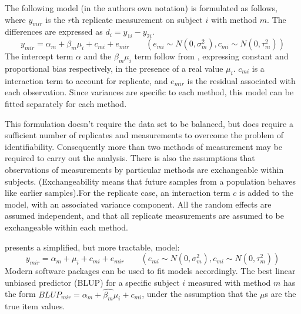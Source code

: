 \documentclass[12pt, a4paper]{report}
\theoremstyle{plain}
\theoremstyle{definition}
\theoremstyle{remark}
\begin{document}
The following model (in the authors own notation) is
formulated as follows, where $y_{mir}$ is the $r$th replicate
measurement on subject $i$ with method $m$. The differences are expressed as $d_{i} = y_{1i} - y_{2i}$.
\begin{equation}
y_{mir}  = \alpha_{m} + \beta_{m}\mu_{i} + c_{mi} + e_{mir} \qquad
( e_{mi} \sim N(0,\sigma^{2}_{m}), c_{mi} \sim N(0,\tau^{2}_{m}))
\end{equation}
The intercept term $\alpha$ and the $\beta_{m}\mu_{i}$ term follow from \citet{DunnSEME}, expressing constant and proportional bias
respectively, in the presence of a real value $\mu_{i}$. $c_{mi}$ is a interaction term to account for replicate, and $e_{mir}$ is the residual associated with each observation. Since variances are specific to each method, this model can be
fitted separately for each method.

This formulation doesn't require the data set to be balanced, but does require a sufficient number of replicates
and measurements to overcome the problem of identifiability. Consequently more than two methods of measurement may
be required to carry out the analysis. There is also the assumptions that observations of measurements by particular methods are exchangeable within subjects. (Exchangeability means that future samples from a population behaves like earlier
samples).For the replicate case, an interaction term $c$ is added to the model, with an associated variance component. All the random effects are assumed independent, and that all replicate measurements are assumed to be exchangeable within each method. 

\citet{BXC2008} presents a simplified, but more tractable, model:
\begin{equation}
y_{mir}  = \alpha_{m} + \mu_{i} + c_{mi} + e_{mir} \qquad ( e_{mi}
\sim N(0,\sigma^{2}_{m}), c_{mi} \sim N(0,\tau^{2}_{m}))
\end{equation}
Modern software packages can be used to fit models accordingly. The best linear unbiased predictor (BLUP) for a specific subject $i$ measured with method $m$ has the form $BLUP_{mir} = \hat{\alpha_{m}} +
\hat{\beta_{m}}\mu_{i} + c_{mi}$, under the assumption that the
$\mu$s are the true item values.



%
%
\end{document}
